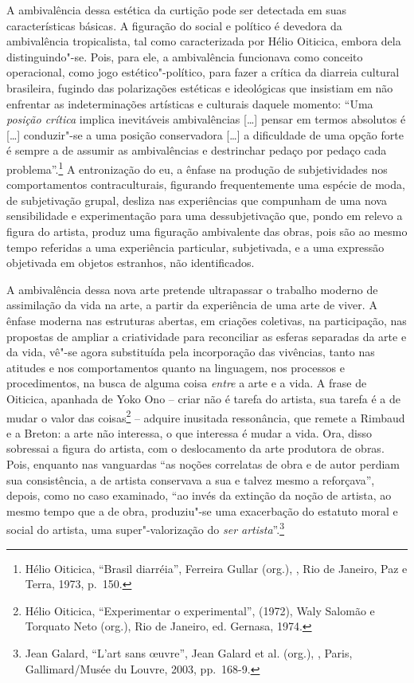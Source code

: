 A ambivalência dessa estética da curtição pode ser detectada em suas
características básicas. A figuração do social e político é devedora da
ambivalência tropicalista, tal como caracterizada por Hélio Oiticica,
embora dela distinguindo"-se. Pois, para ele, a ambivalência funcionava
como conceito operacional, como jogo estético"-político, para fazer a
crítica da diarreia cultural brasileira, fugindo das polarizações
estéticas e ideológicas que insistiam em não enfrentar as
indeterminações artísticas e culturais daquele momento: ``Uma
\emph{posição crítica} implica inevitáveis ambivalências {[}\ldots{}{]}
pensar em termos absolutos é {[}\ldots{}{]} conduzir"-se a uma posição
conservadora {[}\ldots{}{]} a dificuldade de uma opção forte é sempre a de
assumir as ambivalências e destrinchar pedaço por pedaço cada
problema''.\footnote{Hélio Oiticica, ``Brasil diarréia'', Ferreira Gullar (org.), {}, Rio de Janeiro, Paz e Terra, 1973, p.~150.} A entronização do eu, a ênfase na produção de
subjetividades nos comportamentos contraculturais, figurando
frequentemente uma espécie de moda, de subjetivação grupal, desliza nas
experiências que compunham de uma nova sensibilidade e experimentação
para uma dessubjetivação que, pondo em relevo a figura do artista,
produz uma figuração ambivalente das obras, pois são ao mesmo tempo
referidas a uma experiência particular, subjetivada, e a uma expressão
objetivada em objetos estranhos, não identificados.

A ambivalência dessa nova arte pretende ultrapassar o trabalho moderno
de assimilação da vida na arte, a partir da experiência de uma arte de
viver. A ênfase moderna nas estruturas abertas, em criações coletivas,
na participação, nas propostas de ampliar a criatividade para
reconciliar as esferas separadas da arte e da vida, vê"-se agora
substituída pela incorporação das vivências, tanto nas atitudes e nos
comportamentos quanto na linguagem, nos processos e procedimentos, na
busca de alguma coisa \emph{entre} a arte e a vida. A frase de Oiticica,
apanhada de Yoko Ono -- criar não é tarefa do artista, sua tarefa é a de
mudar o valor das coisas\footnote{Hélio Oiticica, ``Experimentar o experimental'',
  {} (1972), Waly Salomão e Torquato Neto (org.), Rio de
  Janeiro, ed. Gernasa, 1974.} -- adquire
inusitada ressonância, que remete a Rimbaud e a Breton: a arte não
interessa, o que interessa é mudar a vida. Ora, disso sobressai a figura
do artista, com o deslocamento da arte produtora de obras. Pois,
enquanto nas vanguardas ``as noções correlatas de obra e de autor
perdiam sua consistência, a de artista conservava a sua e talvez mesmo a
reforçava'', depois, como no caso examinado, ``ao invés da extinção da
noção de artista, ao mesmo tempo que a de obra, produziu"-se uma
exacerbação do estatuto moral e social do artista, uma super"-valorização
do \emph{ser artista}''.\footnote{Jean Galard, ``L'art sans \oe uvre'', Jean Galard et al. (org.),
  {}, Paris, Gallimard/Musée du Louvre, 2003,
  pp.~168-9.}

